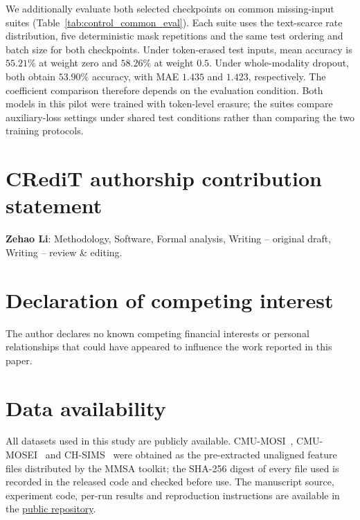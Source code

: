 \documentclass[preprint,11pt]{elsarticle}
\begin{document}
\begin{table}[!htbp]
\centering
\caption{Single-seed CMU-MOSI auxiliary-loss pilot under token-level text-scarce
training. Acc-2 and MAE use complete test inputs. Epoch indices are one-based.
Both conditions use the same local Metal runtime and reconstruction architecture.}
\label{tab:control_pilot}
\small

\end{table}

We additionally evaluate both selected checkpoints on common missing-input
suites (Table~\ref{tab:control_common_eval}). Each suite uses the text-scarce
rate distribution, five deterministic mask repetitions and the same test
ordering and batch size for both checkpoints. Under token-erased test inputs,
mean accuracy is $55.21\%$ at weight zero and $58.26\%$ at weight $0.5$.
Under whole-modality dropout, both obtain $53.90\%$ accuracy, with MAE $1.435$
and $1.423$, respectively. The coefficient comparison therefore depends on
the evaluation condition. Both models in this pilot were trained with
token-level erasure; the suites compare auxiliary-loss settings under shared
test conditions rather than comparing the two training protocols.

\begin{table}[!htbp]
\centering
\caption{Common-suite evaluation of the two pilot checkpoints. Both models
were trained with token-level text-scarce missingness. Each test operator uses
the text-scarce nominal rate distribution; values are means over five mask
repetitions, not repeated training seeds.}
\label{tab:control_common_eval}
\small

\end{table}

\FloatBarrier
\section*{CRediT authorship contribution statement}
\textbf{Zehao Li}: Methodology, Software, Formal analysis,
Writing -- original draft, Writing -- review \& editing.

\section*{Declaration of competing interest}
The author declares no known competing financial interests or personal
relationships that could have appeared to influence the work reported in this
paper.

\section*{Data availability}
All datasets used in this study are publicly available. CMU-MOSI~\cite{mosi},
CMU-MOSEI~\cite{mosei} and CH-SIMS~\cite{mmsa} were obtained
as the pre-extracted unaligned feature files distributed by the MMSA toolkit;
the SHA-256 digest of every file used is recorded in the released code and
checked before use. The manuscript source, experiment code, per-run results
and reproduction instructions are available in the
\href{https://github.com/Yed-13/Token-Level-Missingness-Training-Can-Erode-Clean-Input-Performance-in-Multimodal-Learnin}{public repository}.



\end{document}
